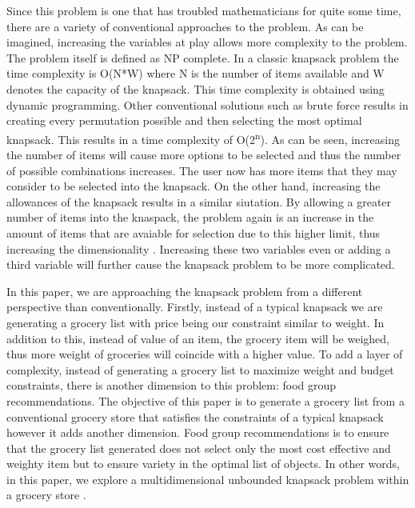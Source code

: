 \documentclass[10pt,journal,compsoc]{IEEEtran}
\begin{document}
Since this problem is one that has troubled mathematicians for quite some time,
there are a variety of conventional approaches to the problem. As can be
imagined, increasing the variables at play allows more complexity to the
problem. The problem itself is defined as NP complete. In a classic knapsack
problem the time complexity is O(N*W) where N is the number of items available
and W denotes the capacity of the knapsack. This time complexity is obtained
using dynamic programming. Other conventional solutions such as brute force
results in creating every permutation possible and then selecting the most
optimal knapsack. This results in a time complexity of O(2\textsuperscript{n}).
As can be seen, increasing the number of items will cause more options to be
selected and thus the number of possible combinations increases. The user now
has more items that they may consider to be selected into the knapsack. On the
other hand, increasing the allowances of the knapsack results in a similar
siutation. By allowing a greater number of items into the knaspack, the problem
again is an increase in the amount of items that are avaiable for selection due
to this higher limit, thus increasing the dimensionality
\cite{caserta_robust_2019}. Increasing these two variables even or adding a
third variable will further cause the knapsack problem to be more complicated.

In this paper, we are approaching the knapsack problem from a different
perspective than conventionally. Firstly, instead of a typical knapsack we are
generating a grocery list with price being our constraint similar to weight. In
addition to this, instead of value of an item, the grocery item will be weighed,
thus more weight of groceries will coincide with a higher value. To add a layer
of complexity, instead of generating a grocery list to maximize weight and
budget constraints, there is another dimension to this problem: food group
recommendations. The objective of this paper is to generate a grocery list from
a conventional grocery store that satisfies the constraints of a typical
knapsack however it adds another dimension. Food group recommendations is to
ensure that the grocery list generated does not select only the most cost
effective and weighty item but to ensure variety in the optimal list of objects.
In other words, in this paper, we explore a multidimensional unbounded knapsack
problem within a grocery store \cite{agha_binary_2021}.
\end{document}
